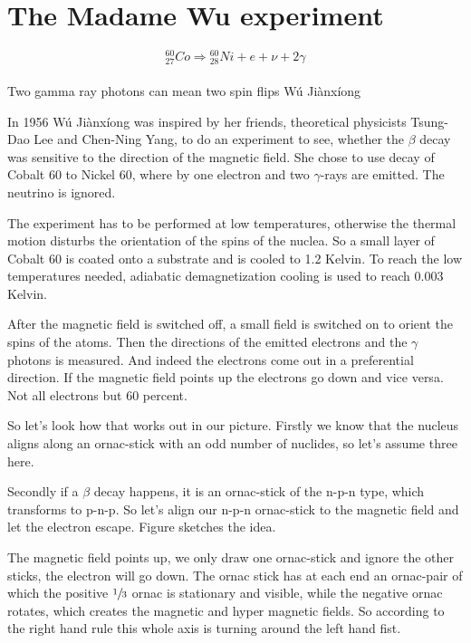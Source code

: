 \section{The Madame Wu %
experiment}
\[^{60}_{27}Co \Rightarrow {^{60}_{28}Ni} + e + \nu + 2 \gamma\]

\paragraph{}
Two  gamma ray photons can mean two spin flips
Wú Jiànxíong


In 1956 Wú Jiànxíong %
was inspired by her friends, theoretical physicists Tsung-Dao Lee and Chen-Ning Yang, to do an experiment to see, whether the $\beta$ decay was sensitive to the direction of the magnetic field. She chose to use decay of Cobalt 60 to Nickel 60, where by one electron and two $\gamma$-rays are emitted. The neutrino is ignored.


The experiment has to be performed at low temperatures, otherwise the thermal motion disturbs the orientation of the spins of the nuclea.
So a small layer of Cobalt 60 is coated onto a substrate and is cooled to 1.2 Kelvin.
To reach the low temperatures needed, adiabatic demagnetization cooling is used to reach 0.003 Kelvin.


After the magnetic field is switched off, a small field is switched on to orient the spins of the atoms.
Then the directions of  the emitted electrons and the $\gamma$ photons is measured.
And indeed the electrons come out in a preferential direction. If the magnetic field points up the electrons go down and vice versa. Not all electrons but 60 percent.


So let's look how that works out in our picture.
Firstly we know that the nucleus aligns along an ornac-stick with an odd number of nuclides, so let's assume three here.


Secondly if a $\beta$ decay happens, it is an ornac-stick of the n-p-n type, which transforms to p-n-p.
So let's align our n-p-n ornac-stick to the magnetic field and let the electron escape.
Figure sketches the idea.


The magnetic field points up, we only draw one ornac-stick and ignore the other sticks, the electron will go down. The ornac stick has at each end an ornac-pair of which the positive $\sfrac{1}{3}$ ornac is stationary and visible, while the negative ornac rotates, which creates the magnetic and hyper magnetic fields. So according to the right hand rule this whole axis is turning around the left hand fist.


